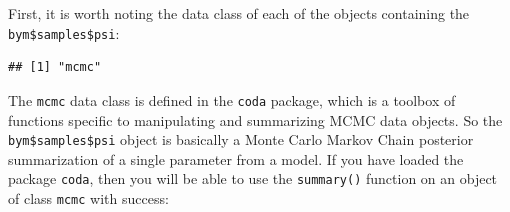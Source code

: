 \documentclass[
]{book}
\newenvironment{Shaded}{\begin{snugshade}}{\end{snugshade}}
\newcommand{\AttributeTok}[1]{\textcolor[rgb]{0.77,0.63,0.00}{#1}}
\newcommand{\CommentTok}[1]{\textcolor[rgb]{0.56,0.35,0.01}{\textit{#1}}}
\newcommand{\DecValTok}[1]{\textcolor[rgb]{0.00,0.00,0.81}{#1}}
\newcommand{\FloatTok}[1]{\textcolor[rgb]{0.00,0.00,0.81}{#1}}
\newcommand{\FunctionTok}[1]{\textcolor[rgb]{0.00,0.00,0.00}{#1}}
\newcommand{\NormalTok}[1]{#1}
\newcommand{\OtherTok}[1]{\textcolor[rgb]{0.56,0.35,0.01}{#1}}
\newcommand{\SpecialCharTok}[1]{\textcolor[rgb]{0.00,0.00,0.00}{#1}}
\begin{document}
First, it is worth noting the data class of each of the objects containing the \texttt{bym\$samples\$psi}:

\begin{Shaded}
\end{Shaded}

\begin{verbatim}
## [1] "mcmc"
\end{verbatim}

The \texttt{mcmc} data class is defined in the \texttt{coda} package, which is a toolbox of functions specific to manipulating and summarizing MCMC data objects. So the \texttt{bym\$samples\$psi} object is basically a Monte Carlo Markov Chain posterior summarization of a single parameter from a model. If you have loaded the package \texttt{coda}, then you will be able to use the \texttt{summary()} function on an object of class \texttt{mcmc} with success:

\begin{Shaded}
\end{Shaded}
\end{document}
